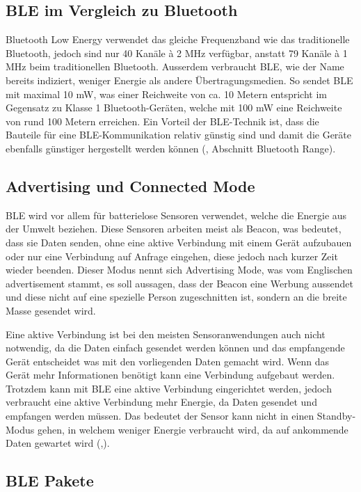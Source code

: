 \subsection{BLE im Vergleich zu Bluetooth}
  
Bluetooth Low Energy verwendet das gleiche Frequenzband wie das traditionelle Bluetooth, jedoch sind nur 40 Kanäle \`{a} 2 MHz verfügbar, anstatt 79 Kanäle \`{a} 1 MHz beim traditionellen Bluetooth. Ausserdem verbraucht BLE, wie der Name bereits indiziert, weniger Energie als andere Übertragungsmedien. So sendet BLE mit maximal 10 mW, was einer Reichweite von ca. 10 Metern entspricht im Gegensatz zu Klasse 1 Bluetooth-Geräten, welche mit 100 mW eine Reichweite von rund 100 Metern erreichen. Ein Vorteil der BLE-Technik ist, dass die Bauteile für eine BLE-Kommunikation relativ günstig sind und damit die Geräte ebenfalls günstiger hergestellt werden können (\cite{Interent_BLE}, Abschnitt Bluetooth Range).

\subsection{Advertising und Connected Mode}

BLE wird vor allem für batterielose Sensoren verwendet, welche die Energie aus der Umwelt beziehen. Diese Sensoren arbeiten meist als Beacon, was bedeutet, dass sie Daten senden, ohne eine aktive Verbindung mit einem Gerät aufzubauen oder nur eine Verbindung auf Anfrage eingehen, diese jedoch nach kurzer Zeit wieder beenden. Dieser Modus nennt sich Advertising Mode, was vom Englischen advertisement stammt, es soll aussagen, dass der Beacon eine Werbung aussendet und diese nicht auf eine spezielle Person zugeschnitten ist, sondern an die breite Masse gesendet wird.

Eine aktive Verbindung ist bei den meisten Sensoranwendungen auch nicht notwendig, da die Daten einfach gesendet werden können und das empfangende Gerät entscheidet was mit den vorliegenden Daten gemacht wird. Wenn das Gerät mehr Informationen benötigt kann eine Verbindung aufgebaut werden. Trotzdem kann mit BLE eine aktive Verbindung eingerichtet werden, jedoch verbraucht eine aktive Verbindung mehr Energie, da Daten gesendet und empfangen werden müssen. Das bedeutet der Sensor kann nicht in einen Standby- Modus gehen, in welchem weniger Energie verbraucht wird, da auf ankommende Daten gewartet wird (\cite{BLE_advertising},\cite{ELKO_BLE}).

\subsection{BLE Pakete}


